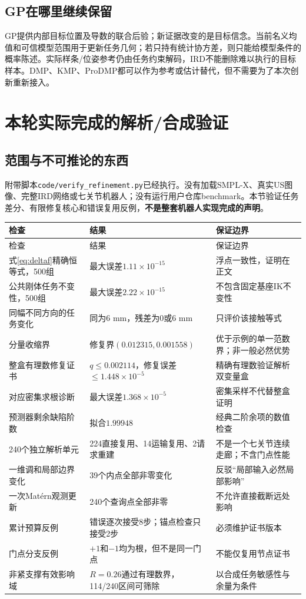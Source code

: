 \documentclass[UTF8,11pt,a4paper,fontset=fandol]{ctexart}
\numberwithin{equation}{section}
\theoremstyle{definition}
\begin{document}
\subsection{GP在哪里继续保留}
GP提供内部目标位置及导数的联合后验；新证据改变的是目标信念。当前名义均值和可信模型范围用于更新任务几何；若只持有统计协方差，则只能给模型条件的概率陈述。实际样条/位姿参考仍由任务约束解码，IRD不能删除难以执行的目标样本。DMP、KMP、ProDMP都可以作为参考或估计替代，但不需要为了本次创新重新接入。

\section{本轮实际完成的解析/合成验证}
\subsection{范围与不可推论的东西}
附带脚本\texttt{code/verify\_refinement.py}已经执行。没有加载SMPL-X、真实US图像、完整IRD网络或七关节机器人；没有运行用户仓库benchmark。本节验证任务差分、有限修复核心和错误复用反例，\textbf{不是整套机器人实现完成的声明}。

\begin{longtable}{p{}p{}p{}}
\toprule 检查 & 结果 & 保证边界\\\midrule\endfirsthead
\toprule 检查 & 结果 & 保证边界\\\midrule\endhead
式\eqref{eq:deltaf}精确恒等式，500组 & 最大误差$1.11\times10^{-15}$ & 浮点一致性，证明在正文\\
公共刚体任务不变性，500组 & 最大误差$2.22\times10^{-15}$ & 不包含固定基座IK不变性\\
同幅不同方向的任务变化 & 同为6 mm，残差为0或6 mm & 只评价该接触等式\\
分量收缩界 & 修复界$(0.012315,0.001558)$ & 优于示例的单一范数界；非一般必然优势\\
整盒有理数修复证书 & $q\le0.002114$，修复误差$\le1.448\times10^{-5}$ & 精确有理数验证解析双变量盒\\
对应密集求根诊断 & 最大误差$1.368\times10^{-5}$ & 密集采样不代替整盒证明\\
预测器剩余缺陷阶数 & 拟合$1.99948$ & 经典二阶余项的数值检查\\
240个独立解析单元 & 224直接复用、14运输复用、2请求重建 & 不是一个七关节连续走廊；不含门点性能\\
一维调和局部边界变化 & 39个内点全部非零变化 & 反驳“局部输入必然局部影响”\\
一次Mat\'ern观测更新 & 240个查询点全部非零 & 不允许直接截断远处影响\\
累计预算反例 & 错误逐次接受8步；锚点检查只接受2步 & 必须维护证书版本\\
门点分支反例 & $+1$和$-1$均为根，但不是同一门点 & 不能仅复用节点证书\\
非紧支撑有效影响域 & $R=0.26$通过有理数界，114/240区间可筛除 & 以合成任务敏感性与余量为条件\\\bottomrule
\end{longtable}
\end{document}
